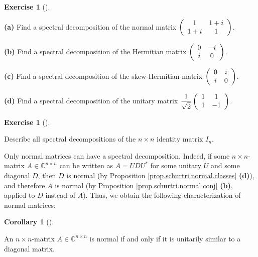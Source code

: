 \documentclass[numbers=enddot,12pt,final,onecolumn,notitlepage]{scrartcl}%
\newcounter{exer}
\numberwithin{exer}{subsection}
\theoremstyle{definition}
\newtheorem{coro}[theo]{Corollary}
\newenvironment{corollary}[1][]
{\begin{coro}[#1]\begin{leftbar}}
{\end{leftbar}\end{coro}}
\newtheorem{exmp}[exer]{Exercise}
\newenvironment{exercise}[1][]
{\begin{exmp}[#1]\begin{leftbar}}
{\end{leftbar}\end{exmp}}
\begin{document}
\begin{exercise}
\label{exe.schurtri.normal.examples} \textbf{(a)} Find a spectral
decomposition of the normal matrix $\left(
\begin{array}
[c]{cc}%
1 & 1+i\\
1+i & 1
\end{array}
\right)  $. \medskip

\textbf{(b)} Find a spectral decomposition of the Hermitian matrix $\left(
\begin{array}
[c]{cc}%
0 & -i\\
i & 0
\end{array}
\right)  $. \medskip

\textbf{(c)} Find a spectral decomposition of the skew-Hermitian matrix
$\left(
\begin{array}
[c]{cc}%
0 & i\\
i & 0
\end{array}
\right)  $. \medskip

\textbf{(d)} Find a spectral decomposition of the unitary matrix $\dfrac
{1}{\sqrt{2}}\left(
\begin{array}
[c]{cc}%
1 & 1\\
1 & -1
\end{array}
\right)  $.
\end{exercise}

\begin{exercise}
 Describe all spectral decompositions of the $n\times n$ identity
matrix $I_{n}$.
\end{exercise}

Only normal matrices can have a spectral decomposition. Indeed, if some
$n\times n$-matrix $A\in\mathbb{C}^{n\times n}$ can be written as
$A=UDU^{\ast}$ for some unitary $U$ and some diagonal $D$, then $D$ is normal
(by Proposition \ref{prop.schurtri.normal.classes} \textbf{(d)}), and
therefore $A$ is normal (by Proposition \ref{prop.schurtri.normal.conj}
\textbf{(b)}, applied to $D$ instead of $A$). Thus, we obtain the following
characterization of normal matrices:

\begin{corollary}
\label{cor.schurtri.normal.normal-iff}An $n\times n$-matrix $A\in
\mathbb{C}^{n\times n}$ is normal if and only if it is unitarily similar to a
diagonal matrix.
\end{corollary}
\end{document}
